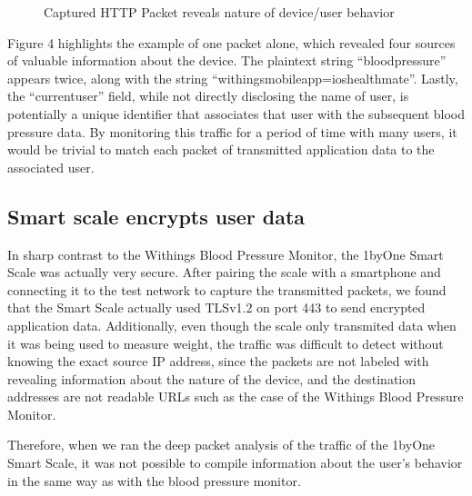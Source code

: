 \begin{figure}
  \caption{Captured HTTP Packet reveals nature of device/user behavior}
  \centering
\end{figure}

Figure 4 highlights the example of one packet alone, which revealed four sources of valuable information about the device. The plaintext string ``blood\textunderscore pressure'' appears twice, along with the string ``withings\textunderscore mobile\textunderscore app=ios\textunderscore healthmate''. Lastly, the ``current\textunderscore user'' field, while not directly disclosing the name of user, is potentially a unique identifier that associates that user with the subsequent blood pressure data. By monitoring this traffic for a period of time with many users, it would be trivial to match each packet of transmitted application data to the associated user. 

\subsection{Smart scale encrypts user data}
In sharp contrast to the Withings Blood Pressure Monitor, the 1byOne Smart Scale was actually very secure. After pairing the scale with a smartphone and connecting it to the test network to capture the transmitted packets, we found that the Smart Scale actually used TLSv1.2 on port 443 to send encrypted application data. Additionally, even though the scale only transmited data when it was being used to measure weight, the traffic was difficult to detect without knowing the exact source IP address, since the packets are not labeled with revealing information about the nature of the device, and the destination addresses are not readable URLs such as the case of the Withings Blood Pressure Monitor. 

Therefore, when we ran the deep packet analysis of the traffic of the 1byOne Smart Scale, it was not possible to compile information about the user's behavior in the same way as with the blood pressure monitor. 
